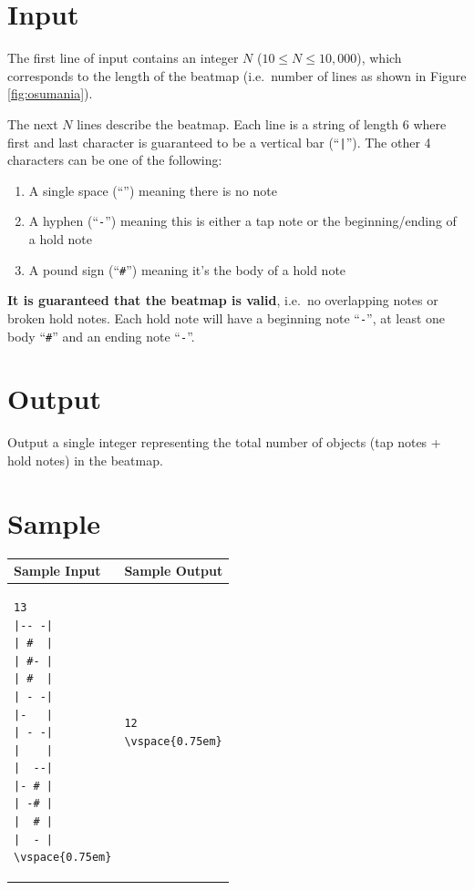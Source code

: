 \documentclass[12pt]{article}
\newenvironment{tabularverbatim}
{\VerbatimEnvironment
\begin{BVerbatim}[baseline=t]}
{\vspace{0.75em}\end{BVerbatim}}
\begin{document}
\section{Input}

The first line of input contains an integer $N$ ($10 \leq N \leq 10,000$), which corresponds to the length of the beatmap (i.e.~number of lines as shown in Figure \ref{fig:osumania}).

The next $N$ lines describe the beatmap. Each line is a string of length 6 where first and last character is guaranteed to be a vertical bar (``\texttt{|}''). The other 4 characters can be one of the following:

\begin{enumerate}
\item A single space (``\enskip'') meaning there is no note

\item A hyphen (``\texttt{-}'') meaning this is either a tap note or the beginning/ending of a hold note

\item A pound sign (``\texttt{\#}'') meaning it's the body of a hold note
\end{enumerate}
\textbf{It is guaranteed that the beatmap is valid}, i.e.~no overlapping notes or broken hold notes. Each hold note will have a beginning note ``\texttt{-}'', at least one body ``\texttt{\#}'' and an ending note ``\texttt{-}''.

\section{Output}

Output a single integer representing the total number of objects (tap notes + hold notes) in the beatmap.

\section{Sample}

\begin{center}
\def\arraystretch{1.8}%
\begin{tabular}{|p{}|p{}|}
\hline
Sample Input & Sample Output\\
\hline
\begin{tabularverbatim}
13
|-- -|
| #  |
| #- |
| #  |
| - -|
|-   |
| - -|
|    |
|  --|
|- # |
| -# |
|  # |
|  - |
\end{tabularverbatim}
&
\begin{tabularverbatim}
12
\end{tabularverbatim}
\\ \hline
\end{tabular}

\vspace{20pt}

\end{center}
\end{document}
